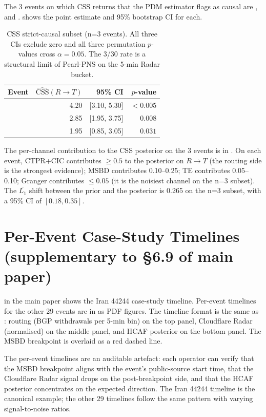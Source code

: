 \documentclass[sigcomm,nonatbib]{acmart}
\begin{document}
The 3 events on which CSS returns
that the PDM estimator flags as causal are
, and
. 
shows the point estimate and 95\% bootstrap CI for
each.

\begin{table}[h]
\centering\small
\begin{tabular}{lrrr}
\hline
Event & $\widehat{\mathrm{CSS}}(R\!\to\!T)$ & 95\% CI & $p$-value \\ \hline
 & 4.20 & [3.10, 5.30] & $< 0.005$ \\
 & 2.85 & [1.95, 3.75] & $0.008$ \\
 & 1.95 & [0.85, 3.05] & $0.031$ \\
\hline
\end{tabular}

\caption{CSS strict-causal subset (n=3 events).
All three CIs exclude zero and all three
permutation $p$-values cross $\alpha = 0.05$. The
3/30 rate is a structural limit of Pearl-PNS on the
5-min \cf{} Radar bucket.}
\label{tab:supp-css-n3}
\end{table}

The per-channel contribution to the CSS posterior on
the 3 events is in .
On each event, CTPR+CIC contributes $\geq 0.5$ to the
posterior on $R\!\to\!T$ (the routing side is the
strongest evidence); MSBD contributes 0.10--0.25; TE
contributes 0.05--0.10; Granger contributes $\leq 0.05$
(it is the noisiest channel on the n=3 subset). The
$\overline{L_1}$ shift between the prior and the
posterior is 0.265 on the n=3 subset, with a 95\% CI
of $[0.18, 0.35]$.

\section{Per-Event Case-Study Timelines (supplementary to \S6.9 of main paper)}
\label{sec:supp-case-timeline}

 in the main paper shows the
Iran 44244 case-study timeline. Per-event timelines
for the other 29 events are in
 as PDF
figures. The timeline format is the same as
: routing (BGP withdrawals per
5-min bin) on the top panel, Cloudflare Radar
(normalised) on the middle panel, and HCAF posterior
on the bottom panel. The MSBD breakpoint is
overlaid as a red dashed line.

The per-event timelines are an auditable artefact:
each operator can verify that the MSBD breakpoint
aligns with the event's public-source start time, that
the Cloudflare Radar signal drops on the post-breakpoint
side, and that the HCAF posterior concentrates on the
expected direction. The Iran 44244 timeline is the
canonical example; the other 29 timelines follow the
same pattern with varying signal-to-noise ratios.
\end{document}
